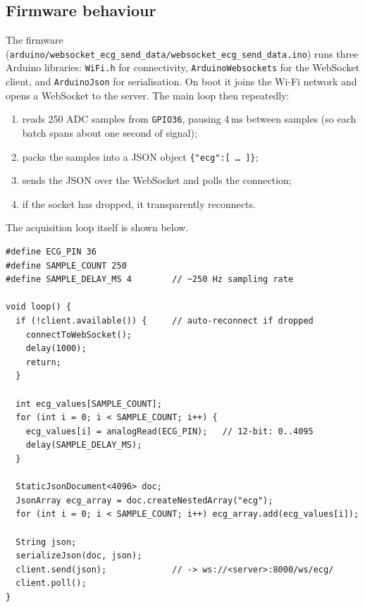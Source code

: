 \subsection{Firmware behaviour}
The firmware
(\texttt{arduino/websocket\_ecg\_send\_data/websocket\_ecg\_send\_data.ino})
runs three Arduino libraries: \texttt{WiFi.h} for connectivity,
\texttt{ArduinoWebsockets} for the WebSocket client, and \texttt{ArduinoJson} for
serialisation. On boot it joins the Wi-Fi network and opens a WebSocket to the
server. The main loop then repeatedly:

\begin{enumerate}[noitemsep]
  \item reads 250 ADC samples from \texttt{GPIO36}, pausing 4\,ms between samples
        (so each batch spans about one second of signal);
  \item packs the samples into a JSON object \texttt{\{"ecg":[\,\ldots\,]\}};
  \item sends the JSON over the WebSocket and polls the connection;
  \item if the socket has dropped, it transparently reconnects.
\end{enumerate}

The acquisition loop itself is shown below.

\begin{lstlisting}[style=cpp,caption={ESP32 sampling and transmit loop (abridged).}]
#define ECG_PIN 36
#define SAMPLE_COUNT 250
#define SAMPLE_DELAY_MS 4        // ~250 Hz sampling rate

void loop() {
  if (!client.available()) {     // auto-reconnect if dropped
    connectToWebSocket();
    delay(1000);
    return;
  }

  int ecg_values[SAMPLE_COUNT];
  for (int i = 0; i < SAMPLE_COUNT; i++) {
    ecg_values[i] = analogRead(ECG_PIN);   // 12-bit: 0..4095
    delay(SAMPLE_DELAY_MS);
  }

  StaticJsonDocument<4096> doc;
  JsonArray ecg_array = doc.createNestedArray("ecg");
  for (int i = 0; i < SAMPLE_COUNT; i++) ecg_array.add(ecg_values[i]);

  String json;
  serializeJson(doc, json);
  client.send(json);             // -> ws://<server>:8000/ws/ecg/
  client.poll();
}
\end{lstlisting}

